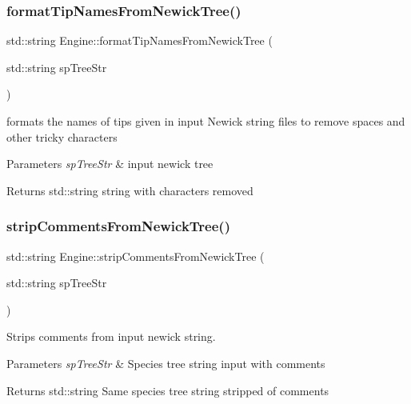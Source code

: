 \subsubsection{\texorpdfstring{formatTipNamesFromNewickTree()}{formatTipNamesFromNewickTree()}}
{\footnotesize\ttfamily std\+::string Engine\+::format\+Tip\+Names\+From\+Newick\+Tree (\begin{DoxyParamCaption}\item[{std\+::string}]{sp\+Tree\+Str }\end{DoxyParamCaption})}



formats the names of tips given in input Newick string files to remove spaces and other tricky characters 


\begin{DoxyParams}{Parameters}
{\em sp\+Tree\+Str} & input newick tree\\
\hline
\end{DoxyParams}
\begin{DoxyReturn}{Returns}
std\+::string string with characters removed 
\end{DoxyReturn}
\mbox{\label{class_engine_a204081a6384298f9804e8048f09a03b0}} 
\subsubsection{\texorpdfstring{stripCommentsFromNewickTree()}{stripCommentsFromNewickTree()}}
{\footnotesize\ttfamily std\+::string Engine\+::strip\+Comments\+From\+Newick\+Tree (\begin{DoxyParamCaption}\item[{std\+::string}]{sp\+Tree\+Str }\end{DoxyParamCaption})}



Strips comments from input newick string. 


\begin{DoxyParams}{Parameters}
{\em sp\+Tree\+Str} & Species tree string input with comments \\
\hline
\end{DoxyParams}
\begin{DoxyReturn}{Returns}
std\+::string Same species tree string stripped of comments 
\end{DoxyReturn}
\mbox{\label{class_engine_a18d3fc6bf175c803bb7155f9372c16df}} 
